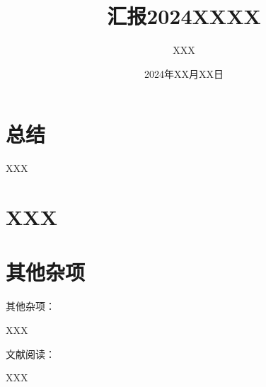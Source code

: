 \documentclass{article}
\title{汇报2024XXXX}
\author{XXX}
\date{2024年XX月XX日}
\begin{document}
\maketitle

\section{总结}

\begin{compactenum}
    \item XXX
\end{compactenum}

\section{XXX}

\section{其他杂项}

其他杂项：
\begin{compactenum}
    \item XXX
\end{compactenum}

文献阅读：

\begin{compactenum}
    \item XXX
\end{compactenum}

\printbibliography[title=参考文献, heading=bibnumbered]
\end{document}
